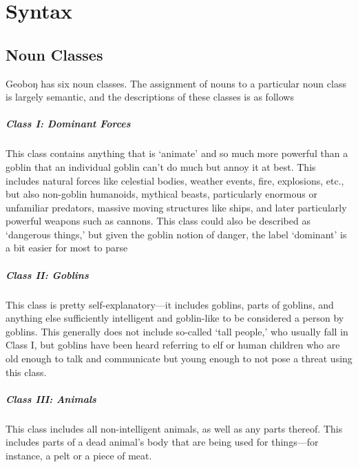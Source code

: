 \documentclass[a4paper,11pt,oneside,openany]{memoir}
\newcommand{\engma}{ŋ}
\begin{document}
\chapter{Syntax}

\section{Noun Classes}

Geobo{\engma} has six noun classes. The assignment of nouns to a particular noun class is largely semantic, and the descriptions of these classes is as follows

\paragraph{Class I: Dominant Forces}

This class contains anything that is `animate' and so much more powerful than a goblin that an individual goblin can't do much but annoy it at best. This includes natural forces like celestial bodies, weather events, fire, explosions, etc., but also non-goblin humanoids, mythical beasts, particularly enormous or unfamiliar predators, massive moving structures like ships, and later particularly powerful weapons such as cannons. This class could also be described as `dangerous things,' but given the goblin notion of danger, the label `dominant' is a bit easier for most to parse

\paragraph{Class II: Goblins}

This class is pretty self-explanatory---it includes goblins, parts of goblins, and anything else sufficiently intelligent and goblin-like to be considered a person by goblins. This generally does not include so-called `tall people,' who usually fall in Class I, but goblins have been heard referring to elf or human children who are old enough to talk and communicate but young enough to not pose a threat using this class.

\paragraph{Class III: Animals}

This class includes all non-intelligent animals, as well as any parts thereof. This includes parts of a dead animal's body that are being used for things---for instance, a pelt or a piece of meat.
\end{document}
